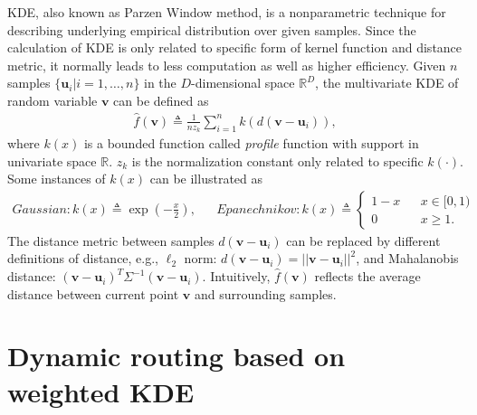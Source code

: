 \documentclass[runningheads]{llncs}
\begin{document}
KDE, also known as Parzen Window method, is a nonparametric technique for describing underlying empirical distribution over given samples. Since the calculation of KDE is only related to specific form of kernel function and distance metric, it normally leads to less computation as well as higher efficiency. Given $n$ samples $\{\boldsymbol{u}_i|i=1,\dots,n\}$ in the $D$-dimensional space $\mathbb{R}^D$, the multivariate KDE of random variable $\boldsymbol{v}$ can be defined as
\begin{align}
\label{eq:kde}
\hat{f}(\boldsymbol{v}) \triangleq \frac{1}{nz_k}\sum\limits_{i=1}^nk(d(\boldsymbol{v}-\boldsymbol{u}_i)),
\end{align}
where $k(x)$ is a bounded function called \textit{profile} function with support in univariate space $\mathbb{R}$. $z_k$ is the normalization constant only related to specific $k(\cdot)$. Some instances of $k(x)$ can be illustrated as~\cite{wand1994kernel}
\begin{align}
Gaussian: k(x)\triangleq\exp{(-\frac{x}{2})}, && Epanechnikov: k(x)\triangleq\left\{\begin{aligned}1-x && x\in{[0,1)}\\ 0 && x\ge{1}.\end{aligned}\right.
\end{align}
The distance metric between samples $d(\boldsymbol{v}-\boldsymbol{u}_i)$ can be replaced by different definitions of distance, e.g., $\ell_2$ norm: $d(\boldsymbol{v}-\boldsymbol{u}_i)=||\boldsymbol{v}-\boldsymbol{u}_i||^2$, and Mahalanobis distance: $(\boldsymbol{v}-\boldsymbol{u}_i)^T\Sigma^{-1}(\boldsymbol{v}-\boldsymbol{u}_i)$. Intuitively, $\hat{f}(\boldsymbol{v})$ reflects the average distance between current point $\boldsymbol{v}$ and surrounding samples.

\section{Dynamic routing based on weighted KDE}
\end{document}
